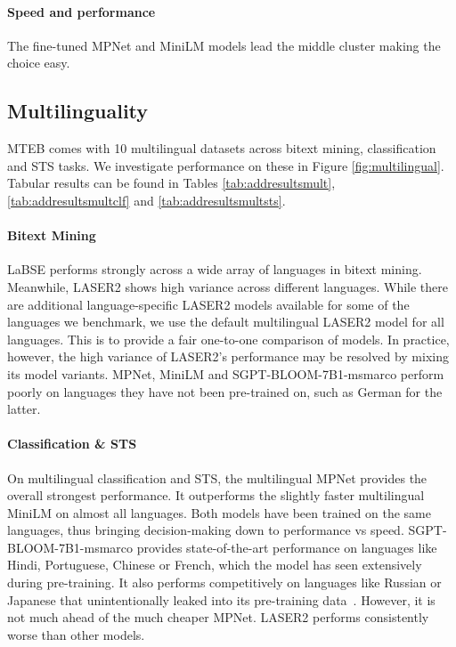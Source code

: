 \documentclass[11pt]{article}
\begin{document}
\paragraph{Speed and performance} The fine-tuned MPNet and MiniLM models lead the middle cluster making the choice easy.

\subsection{Multilinguality}

MTEB comes with 10 multilingual datasets across bitext mining, classification and STS tasks. We investigate performance on these in Figure \ref{fig:multilingual}. Tabular results can be found in Tables \ref{tab:addresultsmult}, \ref{tab:addresultsmultclf} and \ref{tab:addresultsmultsts}.

\paragraph{Bitext Mining} LaBSE \cite{feng2020language} performs strongly across a wide array of languages in bitext mining. Meanwhile, LASER2 shows high variance across different languages. While there are additional language-specific LASER2 models available for some of the languages we benchmark, we use the default multilingual LASER2 model for all languages. This is to provide a fair one-to-one comparison of models. In practice, however, the high variance of LASER2's performance may be resolved by mixing its model variants. MPNet, MiniLM and SGPT-BLOOM-7B1-msmarco perform poorly on languages they have not been pre-trained on, such as German for the latter.

\paragraph{Classification \& STS} On multilingual classification and STS, the multilingual MPNet provides the overall strongest performance. It outperforms the slightly faster multilingual MiniLM on almost all languages. Both models have been trained on the same languages, thus bringing decision-making down to performance vs speed. SGPT-BLOOM-7B1-msmarco provides state-of-the-art performance on languages like Hindi, Portuguese, Chinese or French, which the model has seen extensively during pre-training. It also performs competitively on languages like Russian or Japanese that unintentionally leaked into its pre-training data~\cite{muennighoff2022crosslingual}. However, it is not much ahead of the much cheaper MPNet. LASER2 performs consistently worse than other models.
\end{document}
